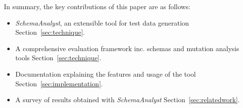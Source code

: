 In summary, the key contributions of this paper are as follows:

\begin{itemize}
\item \textit{SchemaAnalyst}, an extensible tool for test data generation Section~\ref{sec:technique}.
\item A comprehensive evaluation framework inc. schemas and mutation analysis tools Section~\ref{sec:technique}.
\item Documentation explaining the features and usage of the tool Section~\ref{sec:implementation}.
\item A survey of results obtained with \textit{SchemaAnalyst} Section~\ref{sec:relatedwork}.
\end{itemize}
